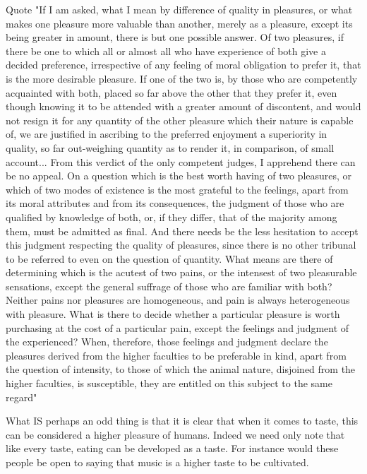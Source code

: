 Quote "If I am asked, what I mean by difference of quality in pleasures, or what
makes one pleasure more valuable than another, merely as a pleasure, except its
being greater in amount, there is but one possible answer. Of two pleasures, if
there be one to which all or almost all who have experience of both give a
decided preference, irrespective of any feeling of moral obligation to prefer it,
that is the more desirable pleasure. If one of the two is, by those who are
competently acquainted with both, placed so far above the other that they prefer
it, even though knowing it to be attended with a greater amount of discontent,
and would not resign it for any quantity of the other pleasure which their nature
is capable of, we are justified in ascribing to the preferred enjoyment a
superiority in quality, so far out-weighing quantity as to render it, in comparison,
of small account...
From this verdict of the only competent judges, I apprehend there can be no
appeal. On a question which is the best worth having of two pleasures, or which
of two modes of existence is the most grateful to the feelings, apart from its
moral attributes and from its consequences, the judgment of those who are
qualified by knowledge of both, or, if they differ, that of the majority among
them, must be admitted as final. And there needs be the less hesitation to accept
this judgment respecting the quality of pleasures, since there is no other tribunal
to be referred to even on the question of quantity. What means are there of
determining which is the acutest of two pains, or the intensest of two pleasurable
sensations, except the general suffrage of those who are familiar with both?
Neither pains nor pleasures are homogeneous, and pain is always heterogeneous
with pleasure. What is there to decide whether a particular pleasure is worth
purchasing at the cost of a particular pain, except the feelings and judgment of
the experienced? When, therefore, those feelings and judgment declare the
pleasures derived from the higher faculties to be preferable in kind, apart from
the question of intensity, to those of which the animal nature, disjoined from the
higher faculties, is susceptible, they are entitled on this subject to the same
regard"

What IS perhaps an odd thing is that it is clear that when it comes to taste, this can be considered a higher pleasure of humans. Indeed we need only note that like every taste, eating can be developed as a taste. For instance would these people be open to saying that music is a higher taste to be cultivated. 



